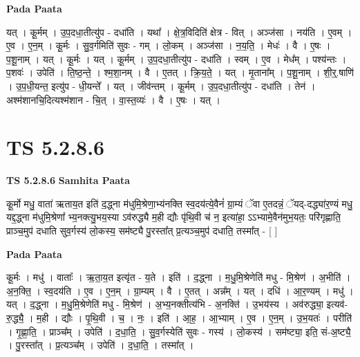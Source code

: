 \documentclass[17pt]{extarticle}
\begin{document}
\textbf{Pada Paata} \newline

यत् । कू॒र्मम् । उ॒प॒दधा॒तीत्यु॑प - दधा॑ति । यथा᳚ । क्षे॒त्र॒विदिति॑ क्षेत्र - वित् । अञ्ज॑सा । नय॑ति । ए॒वम् । ए॒व । ए॒न॒म् । कू॒र्मः । सु॒व॒र्गमिति॑ सुवः - गम् । लो॒कम् । अञ्ज॑सा । न॒य॒ति॒ । मेधः॑ । वै । ए॒षः । प॒शू॒नाम् । यत् । कू॒र्मः । यत् । कू॒र्मम् । उ॒प॒दधा॒तीत्यु॑प - दधा॑ति । स्वम् । ए॒व । मेध᳚म् । पश्य॑न्तः । प॒शवः॑ । उपेति॑ । ति॒ष्ठ॒न्ते॒ । श्म॒शा॒नम् । वै । ए॒तत् । क्रि॒य॒ते॒ । यत् । मृ॒ताना᳚म् । प॒शू॒नाम् । शी॒र्॒.षाणि॑ । उ॒प॒धी॒यन्त॒ इत्यु॑प - धी॒यन्ते᳚ । यत् । जीव॑न्तम् । कू॒र्मम् । उ॒प॒दधा॒तीत्यु॑प - दधा॑ति । तेन॑ । अश्म॑शानचि॒दित्यश्म॑शान - चि॒त् । वा॒स्त॒व्यः॑ । वै । ए॒षः । यत् ।  \newline




\section*{ TS 5.2.8.6 }

\textbf{TS 5.2.8.6 } \newline
\textbf{Samhita Paata} \newline

कू॒र्मो मधु॒ वाता॑ ऋताय॒त इति॑ द॒द्ध्ना म॑धुमि॒श्रेणा॒भ्य॑नक्ति स्व॒दय॑त्ये॒वैनं॑ ग्रा॒म्यं ॅवा ए॒तदन्नं॒ ॅयद्-दद्ध्या॑र॒ण्यं मधु॒ यद्द॒द्ध्ना म॑धुमि॒श्रेणा᳚ भ्य॒नक्त्यु॒भय॒स्या ऽव॑रुद्ध्यै म॒ही द्यौः पृ॑थि॒वी च॑ न॒ इत्या॑हा॒ ऽऽभ्यामे॒वैन॑मुभ॒यतः॒ परि॑गृह्णाति॒ प्राञ्च॒मुप॑ दधाति सुव॒र्गस्य॑ लो॒कस्य॒ सम॑ष्ट्यै पु॒रस्ता᳚त् प्र॒त्यञ्च॒मुप॑ दधाति॒ तस्मा᳚त् - [  ] \newline

\textbf{Pada Paata} \newline

कू॒र्मः । मधु॑ । वाताः᳚ । ऋ॒ता॒य॒त इत्यृ॑त - य॒ते । इति॑ । द॒द्ध्ना । म॒धु॒मि॒श्रेणेति॑ मधु - मि॒श्रेण॑ । अ॒भीति॑ । अ॒न॒क्ति॒ । स्व॒दय॑ति । ए॒व । ए॒न॒म् । ग्रा॒म्यम् । वै । ए॒तत् । अन्न᳚म् । यत् । दधि॑ । आ॒र॒ण्यम् । मधु॑ । यत् । द॒द्ध्ना । म॒धु॒मि॒श्रेणेति॑ मधु - मि॒श्रेण॑ । अ॒भ्य॒नक्तीत्य॑भि - अ॒नक्ति॑ । उ॒भय॑स्य । अव॑रुद्ध्या॒ इत्यव॑-रु॒द्ध्यै॒ । म॒ही । द्यौः । पृ॒थि॒वी । च॒ । नः॒ । इति॑ । आ॒ह॒ । आ॒भ्याम् । ए॒व । ए॒न॒म् । उ॒भ॒यतः॑ । परीति॑ । गृ॒ह्णा॒ति॒ । प्राञ्च᳚म् । उपेति॑ । द॒धा॒ति॒ । सु॒व॒र्गस्येति॑ सुवः - गस्य॑ । लो॒कस्य॑ । सम॑ष्ट्या॒ इति॒ सं-अ॒ष्ट्यै॒ । पु॒रस्ता᳚त् । प्र॒त्यञ्च᳚म् । उपेति॑ । द॒धा॒ति॒ । तस्मा᳚त् ।  \newline
\end{document}
